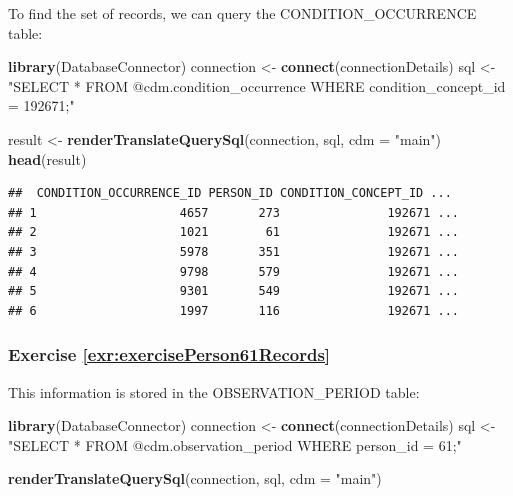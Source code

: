 \documentclass[11pt]{book}
\newenvironment{Shaded}{\begin{snugshade}}{\end{snugshade}}
\newcommand{\DataTypeTok}[1]{\textcolor[rgb]{0.13,0.29,0.53}{#1}}
\newcommand{\KeywordTok}[1]{\textcolor[rgb]{0.13,0.29,0.53}{\textbf{#1}}}
\newcommand{\NormalTok}[1]{#1}
\newcommand{\StringTok}[1]{\textcolor[rgb]{0.31,0.60,0.02}{#1}}
\theoremstyle{definition}
\theoremstyle{definition}
\theoremstyle{definition}
\theoremstyle{remark}
\begin{document}
To find the set of records, we can query the CONDITION\_OCCURRENCE table:

\begin{Shaded}
\begin{Highlighting}[]
\KeywordTok{library}\NormalTok{(DatabaseConnector)}
\NormalTok{connection <-}\StringTok{ }\KeywordTok{connect}\NormalTok{(connectionDetails)}
\NormalTok{sql <-}\StringTok{ "SELECT *}
\StringTok{FROM @cdm.condition_occurrence}
\StringTok{WHERE condition_concept_id = 192671;"}

\NormalTok{result <-}\StringTok{ }\KeywordTok{renderTranslateQuerySql}\NormalTok{(connection, sql, }\DataTypeTok{cdm =} \StringTok{"main"}\NormalTok{)}
\KeywordTok{head}\NormalTok{(result)}
\end{Highlighting}
\end{Shaded}

\begin{verbatim}
##  CONDITION_OCCURRENCE_ID PERSON_ID CONDITION_CONCEPT_ID ...
## 1                    4657       273               192671 ...
## 2                    1021        61               192671 ...
## 3                    5978       351               192671 ...
## 4                    9798       579               192671 ...
## 5                    9301       549               192671 ...
## 6                    1997       116               192671 ...
\end{verbatim}

\hypertarget{exercise-refexrexerciseperson61records}{%
\subsubsection*{Exercise \ref{exr:exercisePerson61Records}}\label{exercise-refexrexerciseperson61records}}

This information is stored in the OBSERVATION\_PERIOD table:

\begin{Shaded}
\begin{Highlighting}[]
\KeywordTok{library}\NormalTok{(DatabaseConnector)}
\NormalTok{connection <-}\StringTok{ }\KeywordTok{connect}\NormalTok{(connectionDetails)}
\NormalTok{sql <-}\StringTok{ "SELECT *}
\StringTok{FROM @cdm.observation_period}
\StringTok{WHERE person_id = 61;"}

\KeywordTok{renderTranslateQuerySql}\NormalTok{(connection, sql, }\DataTypeTok{cdm =} \StringTok{"main"}\NormalTok{)}
\end{Highlighting}
\end{Shaded}
\end{document}
